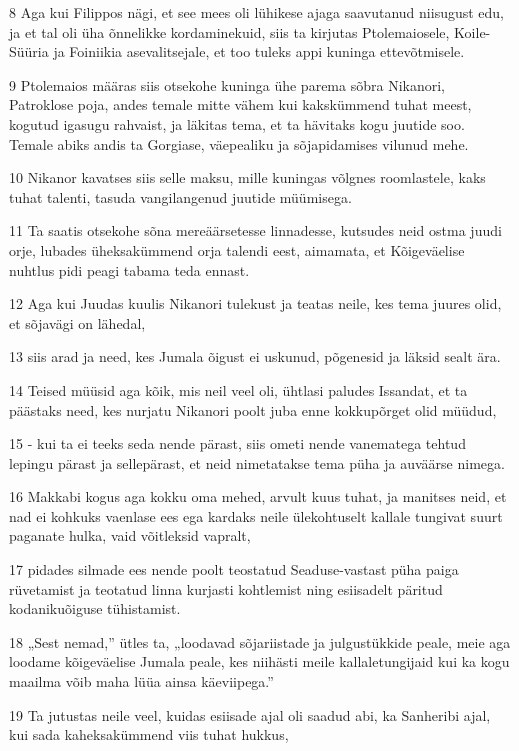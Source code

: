 \par 8 Aga kui Filippos nägi, et see mees oli lühikese ajaga saavutanud niisugust edu, ja et tal oli üha õnnelikke kordaminekuid, siis ta kirjutas Ptolemaiosele, Koile-Süüria ja Foiniikia asevalitsejale, et too tuleks appi kuninga ettevõtmisele.
\par 9 Ptolemaios määras siis otsekohe kuninga ühe parema sõbra Nikanori, Patroklose poja, andes temale mitte vähem kui kakskümmend tuhat meest, kogutud igasugu rahvaist, ja läkitas tema, et ta hävitaks kogu juutide soo. Temale abiks andis ta Gorgiase, väepealiku ja sõjapidamises vilunud mehe.
\par 10 Nikanor kavatses siis selle maksu, mille kuningas võlgnes roomlastele, kaks tuhat talenti, tasuda vangilangenud juutide müümisega.
\par 11 Ta saatis otsekohe sõna mereäärsetesse linnadesse, kutsudes neid ostma juudi orje, lubades üheksakümmend orja talendi eest, aimamata, et Kõigeväelise nuhtlus pidi peagi tabama teda ennast.
\par 12 Aga kui Juudas kuulis Nikanori tulekust ja teatas neile, kes tema juures olid, et sõjavägi on lähedal,
\par 13 siis arad ja need, kes Jumala õigust ei uskunud, põgenesid ja läksid sealt ära.
\par 14 Teised müüsid aga kõik, mis neil veel oli, ühtlasi paludes Issandat, et ta päästaks need, kes nurjatu Nikanori poolt juba enne kokkupõrget olid müüdud,
\par 15 - kui ta ei teeks seda nende pärast, siis ometi nende vanematega tehtud lepingu pärast ja sellepärast, et neid nimetatakse tema püha ja auväärse nimega.
\par 16 Makkabi kogus aga kokku oma mehed, arvult kuus tuhat, ja manitses neid, et nad ei kohkuks vaenlase ees ega kardaks neile ülekohtuselt kallale tungivat suurt paganate hulka, vaid võitleksid vapralt,
\par 17 pidades silmade ees nende poolt teostatud Seaduse-vastast püha paiga rüvetamist ja teotatud linna kurjasti kohtlemist ning esiisadelt päritud kodanikuõiguse tühistamist.
\par 18 „Sest nemad,” ütles ta, „loodavad sõjariistade ja julgustükkide peale, meie aga loodame kõigeväelise Jumala peale, kes niihästi meile kallaletungijaid kui ka kogu maailma võib maha lüüa ainsa käeviipega.”
\par 19 Ta jutustas neile veel, kuidas esiisade ajal oli saadud abi, ka Sanheribi ajal, kui sada kaheksakümmend viis tuhat hukkus,
